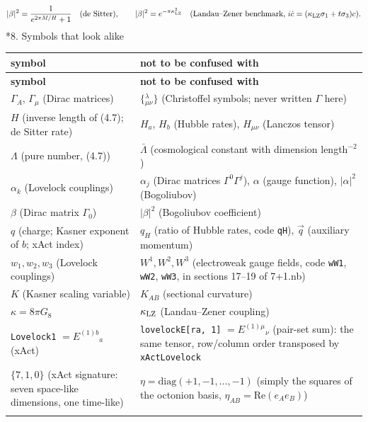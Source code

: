 \documentclass[10pt,a4paper]{article}
\makeatletter
\renewcommand\section{\@startsection{section}{1}{\z@}{-3.5ex \@plus -1ex \@minus -.2ex}{2.3ex \@plus.2ex}{\normalfont\Large\bfseries\raggedright}}
\makeatother
\begin{document}
\begin{equation*}
|\beta|^2=\frac{1}{e^{2\pi M/H}+1}\quad\text{(de Sitter)},\qquad |\beta|^2=e^{-\pi\kappa_{\rm LZ}^2}\quad\text{(Landau–Zener benchmark, } i\dot c=(\kappa_{\rm LZ}\sigma_1+t\sigma_3)c\text{)}.
\end{equation*}
\section*{8. Symbols that look alike}
{\small
\begin{longtable}{>{\raggedright\arraybackslash}p{}>{\raggedright\arraybackslash}p{}}
\toprule
\textbf{symbol} & \textbf{not to be confused with} \\
\midrule\endfirsthead
\toprule
\textbf{symbol} & \textbf{not to be confused with} \\
\midrule\endhead
\endfoot
\bottomrule\endlastfoot
$\Gamma_A$, $\Gamma_\mu$ (Dirac matrices) & $\{{}^{\lambda}_{\mu\nu}\}$ (Christoffel symbols; never written $\Gamma$ here) \\
$H$ (inverse length of (4.7); de Sitter rate) & $H_a$, $H_b$ (Hubble rates), $H_{\mu\nu}$ (Lanczos tensor) \\
$\Lambda$ (pure number, (4.7)) & $\bar\Lambda$ (cosmological constant with dimension length$^{-2}$) \\
$\alpha_k$ (Lovelock couplings) & $\alpha_j$ (Dirac matrices $\Gamma^0\Gamma^j$), $\alpha$ (gauge function), $|\alpha|^2$ (Bogoliubov) \\
$\beta$ (Dirac matrix $\Gamma_0$) & $|\beta|^2$ (Bogoliubov coefficient) \\
$q$ (charge; Kasner exponent of $b$; xAct index) & $q_H$ (ratio of Hubble rates, code \texttt{qH}), $\vec q$ (auxiliary momentum) \\
$w_1,w_2,w_3$ (Lovelock couplings) & $W^1,W^2,W^3$ (electroweak gauge fields, code \texttt{wW1}, \texttt{wW2}, \texttt{wW3}, in sections 17–19 of 7+1.nb) \\
$K$ (Kasner scaling variable) & $K_{AB}$ (sectional curvature) \\
$\kappa=8\pi G_8$ & $\kappa_{\rm LZ}$ (Landau–Zener coupling) \\
\texttt{Lovelock1} $=E^{(1)b}{}_a$ (xAct) & \texttt{lovelockE[ra, 1]} $=E^{(1)\mu}{}_\nu$ (pair-set sum): the same tensor, row/column order transposed by \texttt{xActLovelock} \\
$\{7,1,0\}$ (xAct signature: seven space-like dimensions, one time-like) & $\eta=\mathrm{diag}(+1,-1,\dots,-1)$ (simply the squares of the octonion basis, $\eta_{AB}=\mathrm{Re}(e_Ae_B)$) \\*
\end{longtable}}
\end{document}
